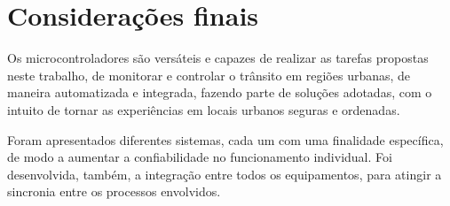 \chapter{Considerações finais}

Os microcontroladores são versáteis e capazes de realizar as tarefas propostas neste trabalho, de monitorar e controlar o trânsito em regiões urbanas, de maneira automatizada e integrada, fazendo parte de soluções adotadas, com o intuito de tornar as experiências em locais urbanos seguras e ordenadas.

Foram apresentados diferentes sistemas, cada um com uma finalidade específica, de modo a aumentar a confiabilidade no funcionamento individual. Foi desenvolvida, também, a integração entre todos os equipamentos, para atingir a sincronia entre os processos envolvidos.



